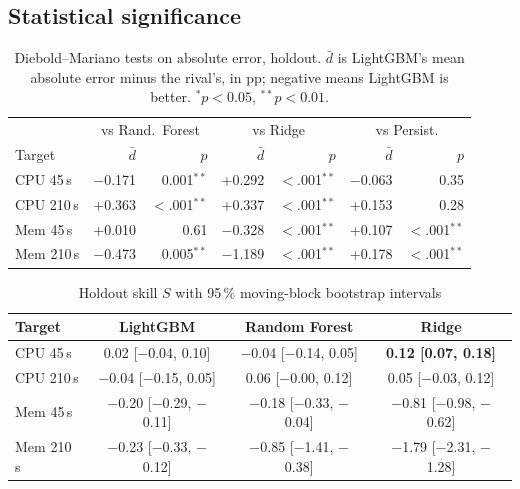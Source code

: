\documentclass[conference]{IEEEtran}
\begin{document}
\subsection{Statistical significance}

\begin{table}[t]
\centering
\caption{Diebold--Mariano tests on absolute error, holdout. $\bar d$ is
LightGBM's mean absolute error minus the rival's, in pp; negative means
LightGBM is better. $^{*}p<0.05$, $^{**}p<0.01$.}
\label{tab:dm}
\footnotesize\setlength{\tabcolsep}{3pt}
\begin{tabular}{@{}l|rr|rr|rr@{}}
\toprule
& \multicolumn{2}{c|}{vs Rand.\ Forest} & \multicolumn{2}{c|}{vs Ridge} & \multicolumn{2}{c}{vs Persist.} \\
Target & $\bar d$ & $p$ & $\bar d$ & $p$ & $\bar d$ & $p$ \\
\midrule
CPU 45\,s  & $-$0.171 & 0.001$^{**}$ & +0.292 & $<$.001$^{**}$ & $-$0.063 & 0.35 \\
CPU 210\,s & +0.363 & $<$.001$^{**}$ & +0.337 & $<$.001$^{**}$ & +0.153 & 0.28 \\
Mem 45\,s  & +0.010 & 0.61 & $-$0.328 & $<$.001$^{**}$ & +0.107 & $<$.001$^{**}$ \\
Mem 210\,s & $-$0.473 & 0.005$^{**}$ & $-$1.189 & $<$.001$^{**}$ & +0.178 & $<$.001$^{**}$ \\
\bottomrule
\end{tabular}
\end{table}

\begin{table}[t]
\centering
\caption{Holdout skill $S$ with 95\,\% moving-block bootstrap intervals}
\label{tab:ci}
\begin{tabular}{@{}lccc@{}}
\toprule
Target & LightGBM & Random Forest & Ridge \\
\midrule
CPU 45\,s  & \phantom{$-$}0.02 [$-$0.04, 0.10] & $-$0.04 [$-$0.14, 0.05] & \phantom{$-$}\textbf{0.12 [0.07, 0.18]} \\
CPU 210\,s & $-$0.04 [$-$0.15, 0.05] & \phantom{$-$}0.06 [$-$0.00, 0.12] & \phantom{$-$}0.05 [$-$0.03, 0.12] \\
Mem 45\,s  & $-$0.20 [$-$0.29, $-$0.11] & $-$0.18 [$-$0.33, $-$0.04] & $-$0.81 [$-$0.98, $-$0.62] \\
Mem 210\,s & $-$0.23 [$-$0.33, $-$0.12] & $-$0.85 [$-$1.41, $-$0.38] & $-$1.79 [$-$2.31, $-$1.28] \\
\bottomrule
\end{tabular}
\end{table}
\end{document}
